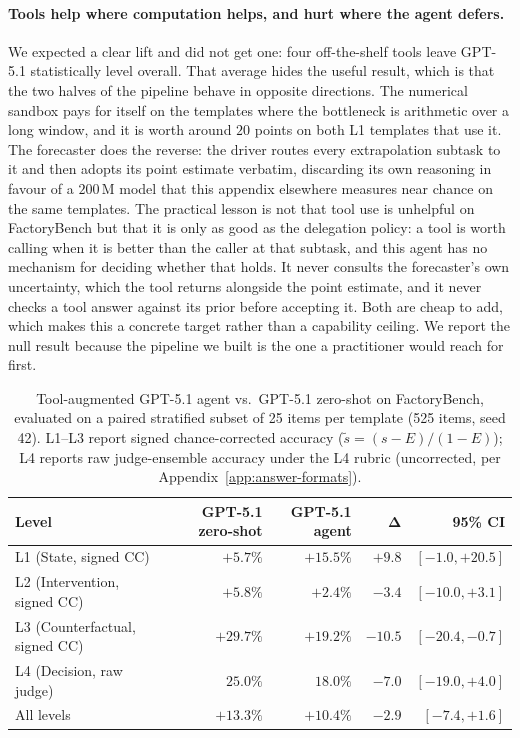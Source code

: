 \paragraph{Tools help where computation helps, and hurt where the agent defers.} We expected a clear lift and did not get one: four off-the-shelf tools leave GPT-5.1 statistically level overall. That average hides the useful result, which is that the two halves of the pipeline behave in opposite directions. The numerical sandbox pays for itself on the templates where the bottleneck is arithmetic over a long window, and it is worth around $20$ points on both L1 templates that use it. The forecaster does the reverse: the driver routes every extrapolation subtask to it and then adopts its point estimate verbatim, discarding its own reasoning in favour of a $200$\,M model that this appendix elsewhere measures near chance on the same templates. The practical lesson is not that tool use is unhelpful on FactoryBench but that it is only as good as the delegation policy: a tool is worth calling when it is better than the caller at that subtask, and this agent has no mechanism for deciding whether that holds. It never consults the forecaster's own uncertainty, which the tool returns alongside the point estimate, and it never checks a tool answer against its prior before accepting it. Both are cheap to add, which makes this a concrete target rather than a capability ceiling. We report the null result because the pipeline we built is the one a practitioner would reach for first.

\begin{table}[htbp]
    \centering
    \caption{Tool-augmented GPT-5.1 agent vs.\ GPT-5.1 zero-shot on FactoryBench, evaluated on a paired stratified subset of 25 items per template (525 items, seed 42). L1--L3 report signed chance-corrected accuracy ($\tilde{s} = (s-E)/(1-E)$); L4 reports raw judge-ensemble accuracy under the L4 rubric (uncorrected, per Appendix~\ref{app:answer-formats}).}
    \label{tab:agent-results}
    \begin{tabular}{@{}l r r r r@{}}
        \toprule
        \textbf{Level} & \textbf{GPT-5.1 zero-shot} & \textbf{GPT-5.1 agent} & $\boldsymbol{\Delta}$ & \textbf{95\% CI} \\
        \midrule
        L1 (State, signed CC)            & $+5.7\%$  & $\mathbf{+15.5\%}$ & $+9.8$  & $[-1.0, +20.5]$  \\
        L2 (Intervention, signed CC)     & $\mathbf{+5.8\%}$  & $+2.4\%$  & $-3.4$  & $[-10.0, +3.1]$  \\
        L3 (Counterfactual, signed CC)   & $\mathbf{+29.7\%}$ & $+19.2\%$ & $-10.5$ & $[-20.4, -0.7]$  \\
        L4 (Decision, raw judge)         & $\mathbf{25.0\%}$  & $18.0\%$  & $-7.0$  & $[-19.0, +4.0]$  \\
        \midrule
        All levels                       & $\mathbf{+13.3\%}$ & $+10.4\%$ & $-2.9$  & $[-7.4, +1.6]$   \\
        \bottomrule
    \end{tabular}
\end{table}


